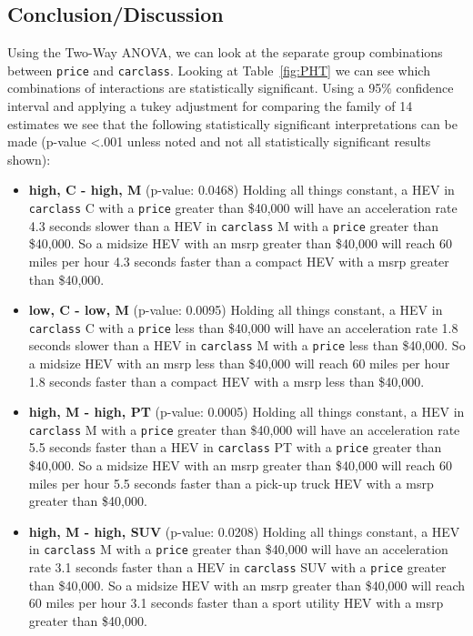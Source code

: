 \documentclass[acmsmall]{acmart}
\begin{document}
\subsection{Conclusion/Discussion}
Using the Two-Way ANOVA, we can look at the separate group combinations between \texttt{price} and \texttt{carclass}. Looking at Table~\ref{fig:PHT} we can see which combinations of interactions are statistically significant. Using a 95\% confidence interval and applying a tukey adjustment for comparing the family of 14 estimates we see that the following statistically significant interpretations can be made (p-value <.001 unless noted and not all statistically significant results shown):\\
\begin{itemize}
\item[] \textbf{high, C - high, M} (p-value: 0.0468) Holding all things constant, a HEV in \texttt{carclass} C with a \texttt{price} greater than \$40,000 will have an acceleration rate 4.3 seconds slower than a HEV in \texttt{carclass} M with a \texttt{price} greater than \$40,000. So a midsize HEV with an msrp greater than \$40,000 will reach 60 miles per hour 4.3 seconds faster than a compact HEV with a msrp greater than \$40,000.
\item[] \textbf{low, C - low, M} (p-value: 0.0095) Holding all things constant, a HEV in \texttt{carclass} C with a \texttt{price} less than \$40,000 will have an acceleration rate 1.8 seconds slower than a HEV in \texttt{carclass} M with a \texttt{price} less than \$40,000. So a midsize HEV with an msrp less than \$40,000 will reach 60 miles per hour 1.8 seconds faster than a compact HEV with a msrp less than \$40,000.
\item[] \textbf{high, M - high, PT} (p-value: 0.0005) Holding all things constant, a HEV in \texttt{carclass} M with a \texttt{price} greater than \$40,000 will have an acceleration rate 5.5 seconds faster than a HEV in \texttt{carclass} PT with a \texttt{price} greater than \$40,000. So a midsize HEV with an msrp greater than \$40,000 will reach 60 miles per hour 5.5 seconds faster than a pick-up truck HEV with a msrp greater than \$40,000.
\item[] \textbf{high, M - high, SUV} (p-value: 0.0208) Holding all things constant, a HEV in \texttt{carclass} M with a \texttt{price} greater than \$40,000 will have an acceleration rate 3.1 seconds faster than a HEV in \texttt{carclass} SUV with a \texttt{price} greater than \$40,000. So a midsize HEV with an msrp greater than \$40,000 will reach 60 miles per hour 3.1 seconds faster than a sport utility HEV with a msrp greater than \$40,000.

\end{itemize}
\end{document}
